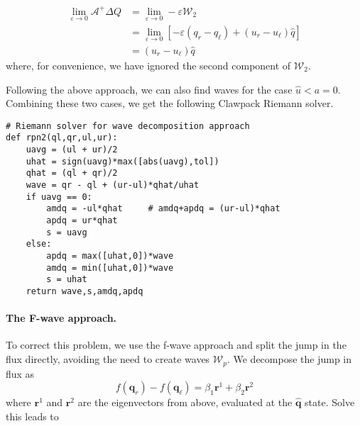 \documentclass{article}
\begin{document}
\begin{align}
\lim_{\varepsilon \rightarrow 0} \mathcal A^+ \Delta Q
& = \lim_{\varepsilon \rightarrow 0} -\varepsilon \mathcal W_2 \\
& = \lim_{\varepsilon \rightarrow 0} \left[-\varepsilon(q_r - q_\ell) + (u_r - u_\ell) \widehat{q}\right] \\
& = (u_r - u_\ell) \widehat{q}
\end{align}
where, for convenience, we have ignored the second component of $\mathcal W_2$. 

Following the above approach, we can also find waves for the case $\widehat{u} < a = 0$.   Combining these two cases, we get the following Clawpack Riemann solver.  

\vspace{0.25cm}

\begin{minipage}{\textwidth}
\begin{verbatim}
# Riemann solver for wave decomposition approach
def rpn2(ql,qr,ul,ur):
    uavg = (ul + ur)/2        
    uhat = sign(uavg)*max([abs(uavg),tol])
    qhat = (ql + qr)/2
    wave = qr - ql + (ur-ul)*qhat/uhat
    if uavg == 0:
        amdq = -ul*qhat     # amdq+apdq = (ur-ul)*qhat
        apdq = ur*qhat
        s = uavg
    else:
        apdq = max([uhat,0])*wave
        amdq = min([uhat,0])*wave        
        s = uhat
    return wave,s,amdq,apdq
\end{verbatim}
\end{minipage}

\vspace{0.25cm}

\paragraph{The F-wave approach.} To correct this problem, we use the f-wave approach and
split the jump in the flux directly, avoiding the need to create waves $\mathcal W_p$.  
We decompose the jump in flux as
\begin{equation}
f(\mathbf q_r) - f(\mathbf q_\ell) = \beta_1 \mathbf r^1 + \beta_2\mathbf r^2
\end{equation}
where $\mathbf r^1$ and $\mathbf r^2$ are the eigenvectors from above, evaluated at the $\widehat{\mathbf q}$ state.   Solve this leads to 
\end{document}
